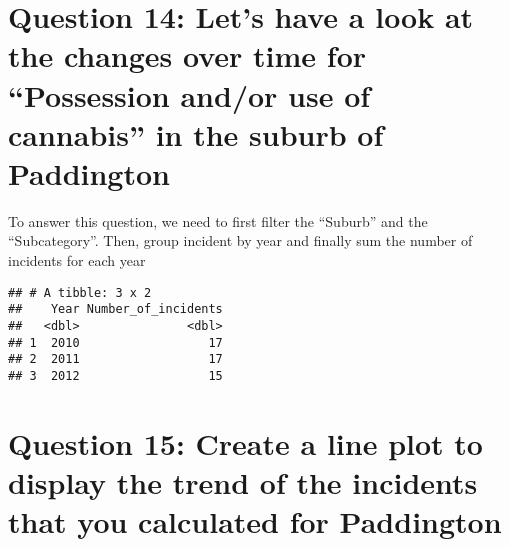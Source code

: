 \documentclass[
]{article}
\newenvironment{Shaded}{\begin{snugshade}}{\end{snugshade}}
\newcommand{\CommentTok}[1]{\textcolor[rgb]{0.56,0.35,0.01}{\textit{#1}}}
\newcommand{\DataTypeTok}[1]{\textcolor[rgb]{0.13,0.29,0.53}{#1}}
\newcommand{\DecValTok}[1]{\textcolor[rgb]{0.00,0.00,0.81}{#1}}
\newcommand{\KeywordTok}[1]{\textcolor[rgb]{0.13,0.29,0.53}{\textbf{#1}}}
\newcommand{\NormalTok}[1]{#1}
\newcommand{\OperatorTok}[1]{\textcolor[rgb]{0.81,0.36,0.00}{\textbf{#1}}}
\newcommand{\StringTok}[1]{\textcolor[rgb]{0.31,0.60,0.02}{#1}}
\begin{document}
\hypertarget{question-14-lets-have-a-look-at-the-changes-over-time-for-possession-andor-use-of-cannabis-in-the-suburb-of-paddington}{%
\section{Question 14: Let's have a look at the changes over time for
``Possession and/or use of cannabis'' in the suburb of
Paddington}\label{question-14-lets-have-a-look-at-the-changes-over-time-for-possession-andor-use-of-cannabis-in-the-suburb-of-paddington}}

To answer this question, we need to first filter the ``Suburb'' and the
``Subcategory''. Then, group incident by year and finally sum the number
of incidents for each year

\begin{Shaded}
\end{Shaded}

\begin{verbatim}
## # A tibble: 3 x 2
##    Year Number_of_incidents
##   <dbl>               <dbl>
## 1  2010                  17
## 2  2011                  17
## 3  2012                  15
\end{verbatim}

\hypertarget{question-15-create-a-line-plot-to-display-the-trend-of-the-incidents-that-you-calculated-for-paddington}{%
\section{Question 15: Create a line plot to display the trend of the
incidents that you calculated for
Paddington}\label{question-15-create-a-line-plot-to-display-the-trend-of-the-incidents-that-you-calculated-for-paddington}}
\end{document}
